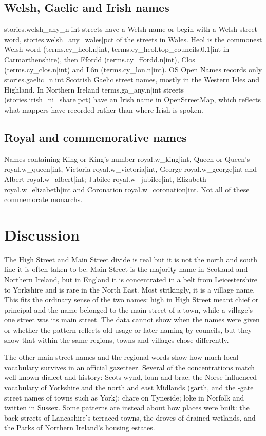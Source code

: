 \documentclass[11pt,a4paper]{article}
\begin{document}
\subsection{Welsh, Gaelic and Irish names}

{{stories.welsh_any_n|int}} streets have a Welsh name or begin with a Welsh street word, {{stories.welsh_any_wales|pct}} of the streets in Wales. Heol is the commonest Welsh word ({{terms.cy_heol.n|int}}, {{terms.cy_heol.top_councils.0.1|int}} in Carmarthenshire), then Ffordd ({{terms.cy_ffordd.n|int}}), Clos ({{terms.cy_clos.n|int}}) and Lôn ({{terms.cy_lon.n|int}}). OS Open Names records only {{stories.gaelic_n|int}} Scottish Gaelic street names, mostly in the Western Isles and Highland. In Northern Ireland {{terms.ga_any.n|int}} streets ({{stories.irish_ni_share|pct}}) have an Irish name in OpenStreetMap, which reflects what mappers have recorded rather than where Irish is spoken.

\subsection{Royal and commemorative names}

Names containing King or King's number {{royal.w_king|int}}, Queen or Queen's {{royal.w_queen|int}}, Victoria {{royal.w_victoria|int}}, George {{royal.w_george|int}} and Albert {{royal.w_albert|int}}; Jubilee {{royal.w_jubilee|int}}, Elizabeth {{royal.w_elizabeth|int}} and Coronation {{royal.w_coronation|int}}. Not all of these commemorate monarchs.

\section{Discussion}

The High Street and Main Street divide is real but it is not the north and south line it is often taken to be. Main Street is the majority name in Scotland and Northern Ireland, but in England it is concentrated in a belt from Leicestershire to Yorkshire and is rare in the North East. Most strikingly, it is a village name. This fits the ordinary sense of the two names: high in High Street meant chief or principal and the name belonged to the main street of a town, while a village's one street was its main street. The data cannot show when the names were given or whether the pattern reflects old usage or later naming by councils, but they show that within the same regions, towns and villages chose differently.

The other main street names and the regional words show how much local vocabulary survives in an official gazetteer. Several of the concentrations match well-known dialect and history: Scots wynd, loan and brae; the Norse-influenced vocabulary of Yorkshire and the north and east Midlands (garth, and the -gate street names of towns such as York); chare on Tyneside; loke in Norfolk and twitten in Sussex. Some patterns are instead about how places were built: the back streets of Lancashire's terraced towns, the droves of drained wetlands, and the Parks of Northern Ireland's housing estates.
\end{document}

